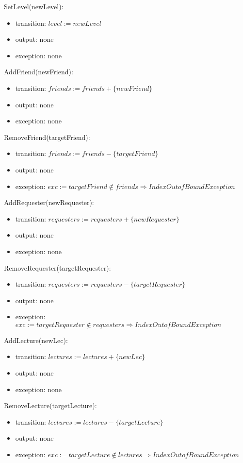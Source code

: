 \documentclass[12pt, titlepage]{article}
\begin{document}
\noindent SetLevel(newLevel):
\begin{itemize}
\item transition: $level := newLevel$
\item output: none
\item exception: none
\end{itemize}

\noindent AddFriend(newFriend):
\begin{itemize}
\item transition: $friends := friends + \{newFriend\}$
\item output: none
\item exception: none
\end{itemize}

\noindent RemoveFriend(targetFriend):
\begin{itemize}
\item transition: $friends := friends - \{targetFriend\}$
\item output: none
\item exception: $exc := targetFriend \notin friends \Rightarrow IndexOutofBound Exception$
\end{itemize}

\noindent AddRequester(newRequester):
\begin{itemize}
\item transition: $requesters := requesters + \{newRequester\}$
\item output: none
\item exception: none
\end{itemize}

\noindent RemoveRequester(targetRequester):
\begin{itemize}
\item transition: $requesters := requesters - \{targetRequester\}$
\item output: none
\item exception: $exc := targetRequester \notin requesters \Rightarrow IndexOutofBound Exception$
\end{itemize}

\noindent AddLecture(newLec):
\begin{itemize}
\item transition: $lectures := lectures + \{newLec\}$
\item output: none
\item exception: none
\end{itemize}

\noindent RemoveLecture(targetLecture):
\begin{itemize}
\item transition: $lectures := lectures - \{targetLecture\}$
\item output: none
\item exception: $exc := targetLecture \notin lectures \Rightarrow IndexOutofBound Exception$
\end{itemize}
\end{document}
